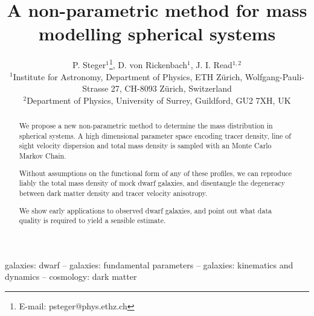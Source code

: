 \documentclass[useAMS,usenatbib]{mn2e}
\title[A non-parametric method for mass modelling spherical systems]{A non-parametric method for mass modelling spherical systems}
\author[Steger]{P. Steger$^1$\thanks{E-mail: psteger@phys.ethz.ch}, D. von Rickenbach$^1$, J. I. Read$^{1,2}$\\
$^1$Institute for Astronomy, Department of Physics, ETH Z\"urich, Wolfgang-Pauli-Strasse 27, CH-8093 Z\"urich, Switzerland\\
$^2$Department of Physics, University of Surrey, Guildford, GU2 7XH, UK
}
\begin{document}
\maketitle

\begin{abstract}
We propose a new non-parametric method to determine the mass
distribution in spherical systems. A high dimensional parameter space
encoding tracer density, line of sight velocity dispersion and total
mass density is sampled with an Monte Carlo Markov Chain.

Without assumptions on the functional form of any of these profiles,
we can reproduce liably the total mass density of mock dwarf galaxies,
and disentangle the degeneracy between dark matter density and tracer
velocity anisotropy.

We show early applications to observed dwarf galaxies, and point out
what data quality is required to yield a sensible estimate.
\end{abstract}

\begin{keywords} galaxies: dwarf  -- galaxies: fundamental parameters  -- galaxies: kinematics and dynamics -- cosmology: dark matter
\end{keywords}












\end{document}
